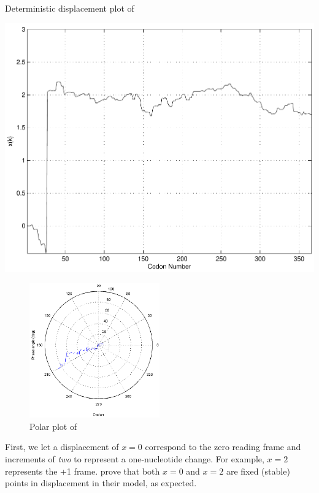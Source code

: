\documentclass[12pt, draft]{article}
\numberwithin{equation}{section}
\begin{document}
\begin{cfigure}
  \caption{Deterministic displacement plot of~\prfB}
  \label{prfB:deterministic}
  \includegraphics[scale=0.4]{prfB/deterministic}
\end{cfigure}

\begin{figure}
  \caption{Polar plot of \prfB}
  \label{prfB:polar}
  \includegraphics[width=0.5\textwidth]{prfB/polar}
\end{figure}

First, we let a displacement of $x = 0$ correspond to the zero reading
frame and increments of \emph{two} to represent a one-nucleotide
change. For example, $x =2$ represents the +1 frame.
\citet{lalit:embs} prove that both $x = 0$ and $x = 2$ are fixed
(stable) points in displacement in their model, as expected.
\end{document}
